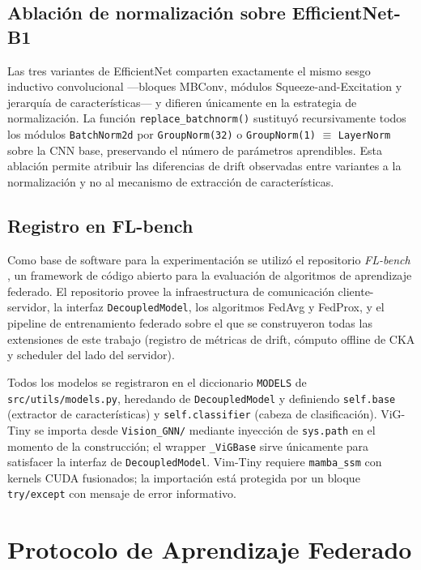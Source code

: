 \subsection{Ablación de normalización sobre EfficientNet-B1}

Las tres variantes de EfficientNet comparten exactamente el mismo sesgo inductivo
convolucional —bloques MBConv, módulos Squeeze-and-Excitation y jerarquía de
características— y difieren únicamente en la estrategia de normalización. La función
\texttt{replace\_batchnorm()} sustituyó recursivamente todos los módulos
\texttt{BatchNorm2d} por \texttt{GroupNorm(32)} o \texttt{GroupNorm(1)} $\equiv$
\texttt{LayerNorm} sobre la CNN base, preservando el número de parámetros aprendibles.
Esta ablación permite atribuir las diferencias de drift observadas entre variantes a la
normalización y no al mecanismo de extracción de características.

\subsection{Registro en FL-bench}

Como base de software para la experimentación se utilizó el repositorio
\textit{FL-bench} \cite{Tan_FL-bench}, un framework de
código abierto para la evaluación de algoritmos de aprendizaje federado. El repositorio
provee la infraestructura de comunicación cliente-servidor, la interfaz \texttt{DecoupledModel},
los algoritmos FedAvg y FedProx, y el pipeline de entrenamiento federado sobre el que se
construyeron todas las extensiones de este trabajo (registro de métricas de drift, cómputo
offline de CKA y scheduler del lado del servidor).

Todos los modelos se registraron en el diccionario \texttt{MODELS} de
\texttt{src/utils/models.py}, heredando de \texttt{DecoupledModel} y definiendo
\texttt{self.base} (extractor de características) y \texttt{self.classifier} (cabeza de
clasificación). ViG-Tiny se importa desde \texttt{Vision\_GNN/} mediante inyección de
\texttt{sys.path} en el momento de la construcción; el wrapper \texttt{\_ViGBase} sirve
únicamente para satisfacer la interfaz de \texttt{DecoupledModel}. Vim-Tiny requiere
\texttt{mamba\_ssm} con kernels CUDA fusionados; la importación está protegida por un
bloque \texttt{try/except} con mensaje de error informativo.

\section{Protocolo de Aprendizaje Federado}

